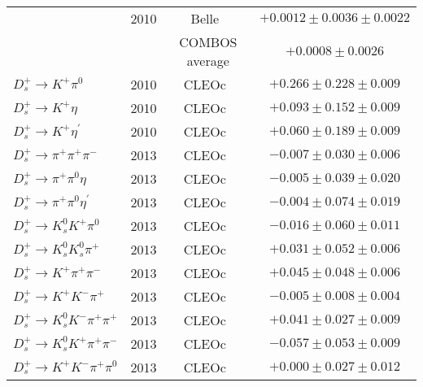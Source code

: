 \begin{table}
\begin{center}
\begin{tabular}{|l|c|c|c|}
& 2010 & Belle~\cite{Ko:2010ng}     & $ +0.0012 \pm 0.0036 \pm 0.0022 $ \\
&      & COMBOS average             & $ +0.0008 \pm 0.0026 $            \\
\hline
{\boldmath $D_s^+ \to K^+ \pi^0$}   &
  2010 & CLEOc~\cite{Mendez:2009aa} &  $ +0.266 \pm 0.228 \pm 0.009 $ \\
\hline
{\boldmath $D_s^+ \to K^+ \eta$}    &
  2010 & CLEOc~\cite{Mendez:2009aa} &  $ +0.093 \pm 0.152 \pm 0.009 $ \\
\hline
{\boldmath $D_s^+ \to K^+ \eta^\prime$}  &
  2010 & CLEOc~\cite{Mendez:2009aa}      &  $ +0.060 \pm 0.189 \pm 0.009 $ \\
\hline
{\boldmath $D_s^+ \to \pi^+ \pi^+ \pi^-$} &
  2013 & CLEOc~\cite{Onyisi:2013aa}        & $ -0.007 \pm 0.030 \pm 0.006 $ \\
\hline
{\boldmath $D_s^+ \to \pi^+ \pi^0 \eta$}  &
  2013 & CLEOc~\cite{Onyisi:2013aa}        & $ -0.005 \pm 0.039 \pm 0.020 $ \\
\hline
{\boldmath $D_s^+ \to \pi^+ \pi^0 \eta^\prime$} &
  2013 & CLEOc~\cite{Onyisi:2013aa}        & $ -0.004 \pm 0.074 \pm 0.019 $ \\
\hline
{\boldmath $D_s^+ \to K^0_s K^+ \pi^0$}   &
  2013 & CLEOc~\cite{Onyisi:2013aa}        & $ -0.016 \pm 0.060 \pm 0.011 $ \\
\hline
{\boldmath $D_s^+ \to K^0_s K^0_s \pi^+$} &
  2013 & CLEOc~\cite{Onyisi:2013aa}        & $ +0.031 \pm 0.052 \pm 0.006 $ \\
\hline
{\boldmath $D_s^+ \to K^+ \pi^+ \pi^-$} &
  2013 & CLEOc~\cite{Onyisi:2013aa}        & $ +0.045 \pm 0.048 \pm 0.006 $ \\
\hline
{\boldmath $D_s^+ \to K^+ K^- \pi^+$} &
  2013 & CLEOc~\cite{Onyisi:2013aa}        & $ -0.005 \pm 0.008 \pm 0.004 $ \\
\hline
{\boldmath $D_s^+ \to K^0_s K^- \pi^+\pi^+$} &
  2013 & CLEOc~\cite{Onyisi:2013aa}        & $ +0.041 \pm 0.027 \pm 0.009 $ \\
\hline
{\boldmath $D_s^+ \to K^0_s K^+ \pi^+\pi^-$} &
  2013 & CLEOc~\cite{Onyisi:2013aa}        & $ -0.057 \pm 0.053 \pm 0.009 $ \\
\hline
{\boldmath $D_s^+ \to K^+ K^- \pi^+\pi^0$} &
  2013 & CLEOc~\cite{Onyisi:2013aa}        & $ +0.000 \pm 0.027 \pm 0.012 $ \\ 
\hline 
\end{tabular}
\end{center} 
\end{table}
